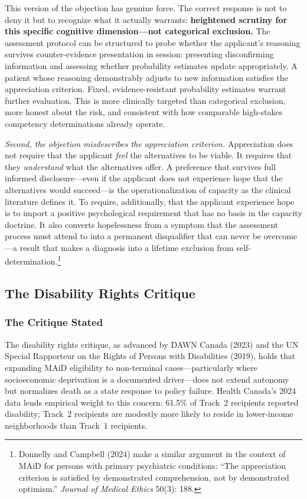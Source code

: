 \documentclass[11pt, letterpaper]{article}
\begin{document}
This version of the objection has genuine force. The correct response is not to deny
it but to recognize what it actually warrants: \textbf{heightened scrutiny for this
specific cognitive dimension---not categorical exclusion.} The assessment protocol can
be structured to probe whether the applicant's reasoning survives counter-evidence
presentation in session: presenting disconfirming information and assessing whether
probability estimates update appropriately. A patient whose reasoning demonstrably
adjusts to new information satisfies the appreciation criterion. Fixed, evidence-resistant
probability estimates warrant further evaluation. This is more clinically targeted than
categorical exclusion, more honest about the risk, and consistent with how comparable
high-stakes competency determinations already operate.

\textit{Second, the objection misdescribes the appreciation criterion.} Appreciation
does not require that the applicant \textit{feel} the alternatives to be viable.
It requires that they \textit{understand} what the alternatives offer. A preference
that survives full informed disclosure---even if the applicant does not experience
hope that the alternatives would succeed---is the operationalization of capacity
as the clinical literature defines it. To require, additionally, that the applicant
experience hope is to import a positive psychological requirement that has no basis
in the capacity doctrine. It also converts hopelessness from a symptom that the
assessment process must attend to into a permanent disqualifier that can never be
overcome---a result that makes a diagnosis into a lifetime exclusion from
self-determination.\footnote{%
  Donnelly and Campbell (2024) make a similar argument in the context of MAiD
  for persons with primary psychiatric conditions: ``The appreciation criterion
  is satisfied by demonstrated comprehension, not by demonstrated optimism.''
  \textit{Journal of Medical Ethics} 50(3): 188.}

\subsection{The Disability Rights Critique}

\subsubsection{The Critique Stated}

The disability rights critique, as advanced by DAWN Canada (2023) and the UN Special
Rapporteur on the Rights of Persons with Disabilities (2019), holds that expanding
MAiD eligibility to non-terminal cases---particularly where socioeconomic deprivation
is a documented driver---does not extend autonomy but normalizes death as a state
response to policy failure. Health Canada's 2024 data lends empirical weight to this
concern: 61.5\% of Track~2 recipients reported disability; Track~2 recipients are
modestly more likely to reside in lower-income neighborhoods than Track~1 recipients.
\end{document}
